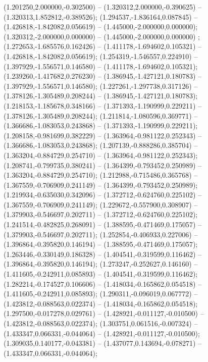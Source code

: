  (1.201250,2.000000,-0.302500) -- (1.320312,2.000000,-0.390625) -- (1.320313,1.852812,-0.389526);
 (1.294537,-1.836164,0.087845) -- (1.426818,-1.842082,0.056619) -- (1.445000,-2.000000,0.000000);
 (1.320312,-2.000000,0.000000) -- (1.445000,-2.000000,0.000000) ;
 (1.272653,-1.685576,0.162426) -- (1.411178,-1.694602,0.105321) -- (1.426818,-1.842082,0.056619);
 (1.254319,-1.546557,0.224910) -- (1.397929,-1.556571,0.146580) -- (1.411178,-1.694602,0.105321);
 (1.239260,-1.417682,0.276230) -- (1.386945,-1.427121,0.180783) -- (1.397929,-1.556571,0.146580);
 (1.227261,-1.297738,0.317126) -- (1.378126,-1.305489,0.208244) -- (1.386945,-1.427121,0.180783);
 (1.218153,-1.185678,0.348166) -- (1.371393,-1.190999,0.229211) -- (1.378126,-1.305489,0.208244);
 (1.211814,-1.080596,0.369771) -- (1.366686,-1.083053,0.243868) -- (1.371393,-1.190999,0.229211);
 (1.208158,-0.981699,0.382229) -- (1.363964,-0.981122,0.252343) -- (1.366686,-1.083053,0.243868);
 (1.207139,-0.888286,0.385704) -- (1.363204,-0.884729,0.254710) -- (1.363964,-0.981122,0.252343);
 (1.208741,-0.799735,0.380241) -- (1.364399,-0.793452,0.250989) -- (1.363204,-0.884729,0.254710);
 (1.212988,-0.715486,0.365768) -- (1.367559,-0.706909,0.241149) -- (1.364399,-0.793452,0.250989);
 (1.219934,-0.635030,0.342096) -- (1.372712,-0.624760,0.225102) -- (1.367559,-0.706909,0.241149);
 (1.229672,-0.557900,0.308907) -- (1.379903,-0.546697,0.202711) -- (1.372712,-0.624760,0.225102);
 (1.241514,-0.482825,0.268091) -- (1.388595,-0.471469,0.175057) -- (1.379903,-0.546697,0.202711);
 (1.252854,-0.406933,0.227006) -- (1.396864,-0.395820,0.146194) -- (1.388595,-0.471469,0.175057);
 (1.263446,-0.330149,0.186328) -- (1.404541,-0.319599,0.116462) -- (1.396864,-0.395820,0.146194);
 (1.273247,-0.252627,0.146160) -- (1.411605,-0.242911,0.085893) -- (1.404541,-0.319599,0.116462);
 (1.282214,-0.174527,0.106606) -- (1.418034,-0.165862,0.054518) -- (1.411605,-0.242911,0.085893);
 (1.290311,-0.096019,0.067772) -- (1.423812,-0.088563,0.022374) -- (1.418034,-0.165862,0.054518);
 (1.297500,-0.017278,0.029761) -- (1.428921,-0.011127,-0.010500) -- (1.423812,-0.088563,0.022374);
 (1.303751,0.061516,-0.007324) -- (1.433347,0.066331,-0.044064) -- (1.428921,-0.011127,-0.010500);
 (1.309035,0.140177,-0.043381) -- (1.437077,0.143694,-0.078271) -- (1.433347,0.066331,-0.044064);
